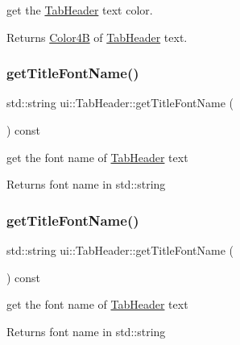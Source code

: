 get the \hyperlink{classui_1_1TabHeader}{Tab\+Header} text color. \begin{DoxyReturn}{Returns}
\hyperlink{structColor4B}{Color4B} of \hyperlink{classui_1_1TabHeader}{Tab\+Header} text. 
\end{DoxyReturn}
\mbox{\label{classui_1_1TabHeader_a24b42bb16f6d2f8bdf66ac9aada7da4e}} 
\subsubsection{\texorpdfstring{get\+Title\+Font\+Name()}{getTitleFontName()}\hspace{0.1cm}{\footnotesize\ttfamily [1/2]}}
{\footnotesize\ttfamily std\+::string ui\+::\+Tab\+Header\+::get\+Title\+Font\+Name (\begin{DoxyParamCaption}{ }\end{DoxyParamCaption}) const}

get the font name of \hyperlink{classui_1_1TabHeader}{Tab\+Header} text \begin{DoxyReturn}{Returns}
font name in std\+::string 
\end{DoxyReturn}
\mbox{\label{classui_1_1TabHeader_a24b42bb16f6d2f8bdf66ac9aada7da4e}} 
\subsubsection{\texorpdfstring{get\+Title\+Font\+Name()}{getTitleFontName()}\hspace{0.1cm}{\footnotesize\ttfamily [2/2]}}
{\footnotesize\ttfamily std\+::string ui\+::\+Tab\+Header\+::get\+Title\+Font\+Name (\begin{DoxyParamCaption}{ }\end{DoxyParamCaption}) const}

get the font name of \hyperlink{classui_1_1TabHeader}{Tab\+Header} text \begin{DoxyReturn}{Returns}
font name in std\+::string 
\end{DoxyReturn}
\mbox{\label{classui_1_1TabHeader_acc9946cbc737165413b60f73c6a28bf9}} 
